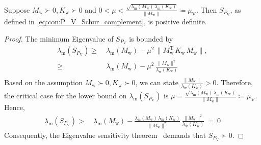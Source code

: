 \begin{lemma}\label{lemma:con:P_V_Schur_complement_positive_definite}
    Suppose $M_\mathrm{w} \succ 0, K_\mathrm{w} \succ 0$ and $0 < \mu < \frac{\sqrt{\lambda_\mathrm{m}(M_\mathrm{w}) \, \lambda_\mathrm{m}\left(K_\mathrm{w}\right)}}{\lVert M_\mathrm{w} \rVert} \coloneqq \mu_\mathrm{V}$. Then $S_{P_\mathrm{V}}$, as defined in \eqref{eq:con:P_V_Schur_complement}, is positive definite.
\end{lemma}
\begin{proof}
    The minimum Eigenvalue of $S_{P_\mathrm{V}}$ is bounded by
    \begin{equation}
    \begin{split}
        \lambda_\mathrm{m}(S_{P_\mathrm{V}}) \geq& \: \lambda_\mathrm{m}(M_\mathrm{w}) - \mu^2 \, \lVert M_\mathrm{w}^\mathrm{T} \, K_\mathrm{w} \, M_\mathrm{w} \rVert,\\
        \geq& \: \lambda_\mathrm{m}(M_\mathrm{w}) - \mu^2 \, \frac{\lVert M_\mathrm{w} \rVert^2}{\lambda_\mathrm{w} \left (K_\mathrm{w} \right )}\\
    \end{split}
    \end{equation}
    Based on the assumption $M_\mathrm{w} \succ 0, K_\mathrm{w} \succ 0$, we can state $\frac{\lVert M_\mathrm{w} \rVert}{\lambda_\mathrm{w}(K_\mathrm{w})} > 0$. Therefore, the critical case for the lower bound on $\lambda_\mathrm{m}(S_{P_\mathrm{V}})$ is $
    \mu = \frac{\sqrt{\lambda_\mathrm{m}(M_\mathrm{w}) \, \lambda_\mathrm{m}\left(K_\mathrm{w}\right)}}{\lVert M_\mathrm{w} \rVert} \coloneqq \mu_\mathrm{V}$. Hence,
    \begin{equation}
    \begin{split}
        \lambda_\mathrm{m}(S_{P_\mathrm{V}}) >& \: \lambda_\mathrm{m}(M_\mathrm{w}) - \frac{\lambda_\mathrm{m}(M_\mathrm{w}) \, \lambda_\mathrm{m}\left(K_\mathrm{w}\right)}{\lVert M_\mathrm{w} \rVert^2} \, \frac{\lVert M_\mathrm{w} \rVert^2}{\lambda_\mathrm{w}(K_\mathrm{w})} \: = \: 0
    \end{split}
    \end{equation}
    Consequently, the Eigenvalue sensitivity theorem~\cite{golub2013matrix} demands that $S_{P_\mathrm{V}} \succ 0$.
\end{proof}

